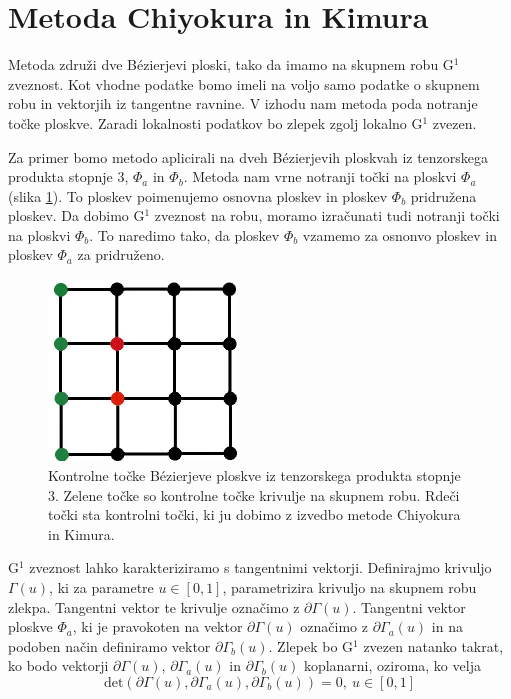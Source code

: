 \documentclass[a4paper,12pt]{article}
\begin{document}
\section{Metoda Chiyokura in Kimura}
	Metoda združi dve Bézierjevi ploski, tako da imamo na skupnem robu G$^1$ zveznost.
	Kot vhodne podatke bomo imeli na voljo samo podatke o skupnem robu in vektorjih iz
	tangentne ravnine. V izhodu nam metoda poda notranje točke ploskve. Zaradi lokalnosti 
	podatkov bo zlepek zgolj lokalno G$^1$ zvezen.
	
	Za primer bomo metodo aplicirali na dveh Bézierjevih ploskvah iz tenzorskega produkta 
	stopnje 3, $\Phi_a$ in $\Phi_b$. Metoda nam vrne notranji točki na ploskvi 
	$\Phi_a$ (slika \ref{fig:domenski_kvadrat_chi_ki}). To ploskev poimenujemo osnovna 
	ploskev in ploskev $\Phi_b$ pridružena ploskev. Da dobimo G$^1$ zveznost na robu, 
	moramo izračunati tudi notranji točki na ploskvi $\Phi_b$. To naredimo tako, da ploskev 
	$\Phi_b$ vzamemo za osnonvo ploskev in ploskev $\Phi_a$ za pridruženo.

	\begin{figure}[h]
		\centering
		\includegraphics[width=5cm]{kvadratna_domena.jpg}
		\caption{Kontrolne točke Bézierjeve ploskve iz tenzorskega produkta stopnje 3. Zelene točke so
		kontrolne točke krivulje na skupnem robu. Rdeči točki 
		sta kontrolni točki, ki ju dobimo z izvedbo metode Chiyokura in Kimura.}
		\label{fig:domenski_kvadrat_chi_ki}
	\end{figure}

	G$^1$ zveznost lahko karakteriziramo s tangentnimi vektorji.
	Definirajmo krivuljo $\Gamma(u)$, ki za parametre $u \in [0, 1]$, parametrizira 
	krivuljo na skupnem robu zlekpa. Tangentni vektor te krivulje označimo z 
	$\partial \Gamma(u)$. Tangentni vektor ploskve $\Phi_a$, ki je pravokoten na vektor
	$\partial \Gamma(u)$ označimo z $\partial \Gamma_a(u)$ in na podoben način definiramo
	vektor $\partial \Gamma_b(u)$. Zlepek bo G$^1$ zvezen natanko takrat, ko bodo 
	vektorji $\partial \Gamma(u)$, $\partial \Gamma_a(u)$ in $\partial \Gamma_b(u)$
	koplanarni, oziroma, ko velja 
	\begin{equation}
		\label{eq:det}
		\text{det} (\partial \Gamma(u), \partial \Gamma_a(u), \partial \Gamma_b(u)) = 0, \ u \in [0, 1]
	\end{equation}
	
\end{document}
